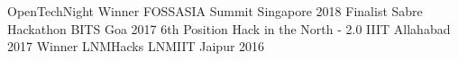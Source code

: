 \begin{cvhonors}
  \cvhonor
    {OpenTechNight Winner}
    {FOSSASIA Summit}
    {Singapore}
    {2018}
  \cvhonor
    {Finalist}
    {Sabre Hackathon}
    {BITS Goa}
    {2017}
  \cvhonor
    {6th Position}
    {Hack in the North - 2.0}
    {IIIT Allahabad}
    {2017}
  \cvhonor
    {Winner}
    {LNMHacks}
    {LNMIIT Jaipur}
    {2016}
\end{cvhonors}

